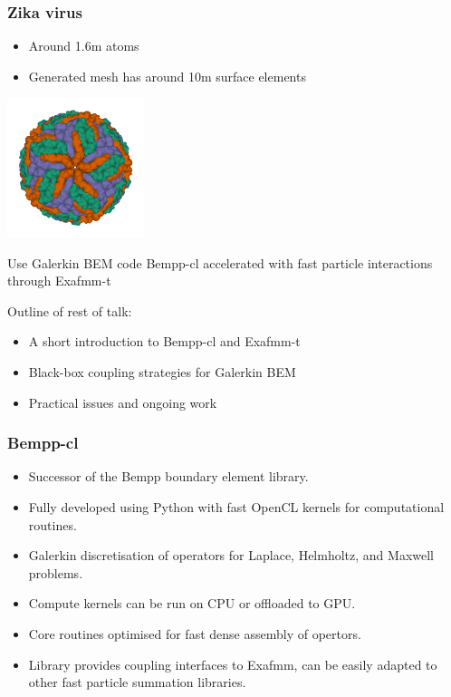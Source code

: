 \documentclass[dvipsnames,10pt]{beamer}
\begin{document}
\begin{frame}
    \frametitle{Zika virus}
    \begin{minipage}{6cm}
        \begin{itemize}
            \item Around 1.6m atoms
            \item Generated mesh has around 10m surface elements
        \end{itemize}
    \end{minipage}
    \begin{minipage}{4cm}
        \includegraphics[width=4cm]{../figs/6CO8_assembly.png}
    \end{minipage}

\begin{tcolorbox}
    Use Galerkin BEM code Bempp-cl accelerated with fast particle interactions through Exafmm-t
\end{tcolorbox}

Outline of rest of talk:
\begin{itemize}
    \item A short introduction to Bempp-cl and Exafmm-t
    \item Black-box coupling strategies for Galerkin BEM
    \item Practical issues and ongoing work
\end{itemize}

\end{frame}

\begin{frame}
    \frametitle{Bempp-cl}
    \begin{itemize}
        \item Successor of the Bempp boundary element library.
        \item Fully developed using Python with fast OpenCL kernels for computational routines.
        \item Galerkin discretisation of operators for Laplace, Helmholtz, and Maxwell problems.
        \item Compute kernels can be run on CPU or offloaded to GPU.
        \item Core routines optimised for fast dense assembly of opertors.
        \item Library provides coupling interfaces to Exafmm, can be easily adapted to other
            fast particle summation libraries.
    \end{itemize}
\end{frame}
\end{document}
